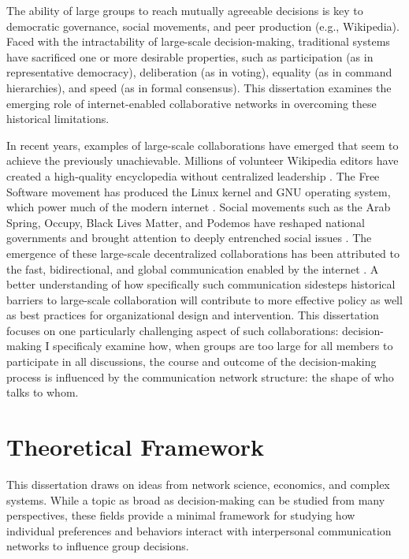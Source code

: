 The ability of large groups to reach mutually agreeable decisions is key to
democratic governance, social movements, and peer production (e.g., Wikipedia).
Faced with the intractability of large-scale decision-making, traditional
systems have sacrificed one or more desirable properties, such as participation
(as in representative democracy), deliberation (as in voting), equality
(as in command hierarchies), and speed (as in formal consensus).
This dissertation examines the emerging role of internet-enabled collaborative
networks in overcoming these historical limitations.

In recent years, examples of large-scale collaborations have emerged that seem
to achieve the previously unachievable. Millions of volunteer Wikipedia editors
have created a high-quality encyclopedia without centralized leadership
\cite{keegan_evolution_2017, giles_internet_2005}.
The Free Software movement has produced the Linux kernel and GNU operating
system, which power much of the modern internet
\cite{coleman_coding_2012, benkler_coases_2002, raymond_cathedral_1999}.
Social movements such as the Arab Spring, Occupy, Black Lives Matter, and
Podemos have reshaped national governments and brought attention to deeply
entrenched social issues
\cite{tufekci_twitter_2017, gonzalez-bailon_networked_2016}.
The emergence of these large-scale decentralized collaborations has been
attributed to the fast, bidirectional,
and global communication enabled by the internet
\cite{tufekci_twitter_2017, benkler_coases_2002}.
A better understanding of how specifically such communication sidesteps
historical barriers to large-scale collaboration will contribute to more
effective policy as well as best practices for organizational design and
intervention.
This dissertation focuses on one particularly challenging aspect of
such collaborations: decision-making
I specificaly examine how,
when groups are too large for all members to participate in all discussions,
the course and outcome of the decision-making process is influenced by the
communication network structure: the shape of who talks to whom.

\section{Theoretical Framework}

This dissertation draws on ideas from network science, economics, and complex
systems.
While a topic as broad as decision-making can be studied from many perspectives,
these fields provide a minimal framework for studying how individual preferences
and behaviors interact with interpersonal communication networks to influence
group decisions.

